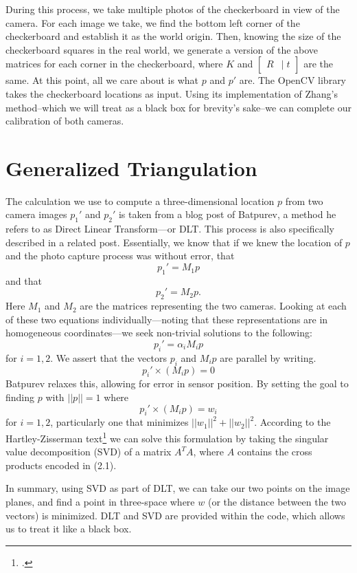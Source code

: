 \documentclass[
    12pt,
    twoside,
    bibstyle=chicago,
    headerstyle=uppercase,
	bibfile=biblatex_updating.bib
]{reedthesis}
\newcommand{\rt}{\left[\begin{smallmatrix}R &|\; t\end{smallmatrix}\right]}
\begin{document}
During this process, we take multiple photos of the checkerboard in view of the camera. For each image we take, we find the bottom left corner of the checkerboard and establish it as the world origin. Then, knowing the size of the checkerboard squares in the real world, we generate a version of the above matrices for each corner in the checkerboard, where $K$ and $\rt$ are the same. At this point, all we care about is what $p$ and $p'$ are. The OpenCV library takes the checkerboard locations as input. Using its implementation of Zhang's method--which we will treat as a black box for brevity's sake--we can complete our calibration of both cameras.


\section{Generalized Triangulation}

The calculation we use to compute a three-dimensional location $p$ from two camera images $p_1'$ and $p_2'$ is taken from a blog post of Batpurev, a method he refers to as Direct Linear Transform---or DLT. \autocite{batpurevStereoCameraCalibration2021} This process is also specifically described in a related post.\autocite{batpurevDirectLinearTransforms2021} Essentially, we know that if we knew the location of $p$ and the photo capture process was without error, that \[p_1'=M_1p\] and that \[p_2'=M_2p.\] Here $M_1$ and $M_2$ are the matrices representing the two cameras. Looking at each of these two equations individually---noting that these representations are in homogeneous coordinates---we seek non-trivial solutions to the following:\[p_i'=\alpha_iM_ip\]
for $i = 1,2$. We assert that the vectors $p_i$ and $M_ip$ are parallel by writing. \[p_i'\times(M_ip)=0\] Batpurev relaxes this, allowing for error in sensor position. By setting the goal to finding $p$ with $||p||=1$ where
\begin{equation}
	p_i'\times (M_ip) = w_i
\end{equation}
for $i = 1,2$, particularly one that minimizes $||w_1||^2+||w_2||^2$. According to the Hartley-Zisserman text\footcite[p. 585-587]{hartleyMultipleViewGeometry2003a} we can solve this formulation by taking the singular value decomposition (SVD) of a matrix $A^TA$, where $A$ contains the cross products encoded in (2.1).

In summary, using SVD as part of DLT, we can take our two points on the image planes, and find a point in three-space where $w$ (or the distance between the two vectors) is minimized. DLT and SVD are provided within the code, which allows us to treat it like a black box.
\end{document}

